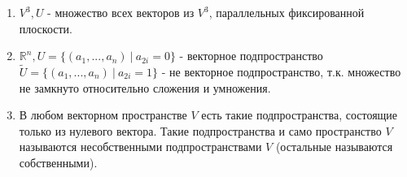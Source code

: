\documentclass[a4paper, 12pt]{article}
\newcommand{\R}{\mathbb R}
\theoremstyle{definition}
\begin{document}
    \begin{enumerate} 
      \item $V^3, U$ - множество всех векторов из $V^3$, параллельных фиксированной\\ плоскости.
      \item $\R^n, U=\{(a_1,..., a_n) \ | \ a_{2i} = 0\}$ - векторное подпространство \\ $\widetilde{U} = \{(a_1,..., a_n) \ | \ a_{2i} = 1\}$ - не векторное подпространство, т.к. множество не замкнуто относительно сложения и умножения.
      \item В любом векторном пространстве $V$ есть такие подпространства, состоящие только из нулевого вектора. Такие подпространства и само пространство $V$ называются несобственными подпространствами $V$ (остальные называются собственными).
    \end{enumerate}
  
  \newpage
\end{document}
